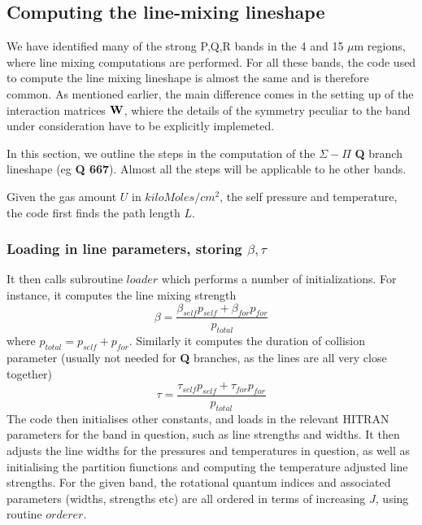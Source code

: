 \documentclass[11pt]{article}
\begin{document}
\subsection{Computing the line-mixing lineshape}

We have identified many of the strong P,Q,R bands in the 4 and 15 $\mu$m 
regions, where line mixing computations are performed. For all these bands, 
the code used to compute the line mixing lineshape is almost the same and
is therefore common. As mentioned earlier, the main difference comes in the
setting up of the interaction matrices ${\bf W}$, whiere the details of the
symmetry peculiar to the band under consideration have to be explicitly
implemeted.

In this section, we outline the steps in the computation of the $\Sigma-\Pi$
{\bf Q} branch lineshape (eg {\bf Q 667}). Almost all the steps will be 
applicable to he other bands.

Given the gas amount $U$ in $kiloMoles/cm^{2}$, the self pressure and 
temperature, the code first finds the path length $L$. 

\subsubsection{Loading in line parameters, storing $\beta, \tau$}
It then calls subroutine $loader$ which performs a number of 
initializations. For instance, it computes the line mixing strength
\[
\beta = \frac{\beta_{self}p_{self} + \beta_{for}p_{for}}{p_{total}}
\]
where $p_{total} = p_{self} + p_{for}$. Similarly it computes the duration 
of collision parameter (usually not needed for {\bf Q} branches, as the 
lines are all very close together)
\[
\tau = \frac{\tau_{self}p_{self} + \tau_{for}p_{for}}{p_{total}}
\]
The code then initialises other constants, and loads in the relevant
HITRAN parameters for the band in question, such as line strengths and 
widths. It then adjusts the line widths for the pressures and temperatures
in question, as well as initialising the partition fiunctions and computing
the temperature adjusted line strengths. For the given band, the rotational
quantum indices and associated parameters (widths, strengths etc) are all
ordered in terms of increasing $J$, using routine $orderer$.
\end{document}
